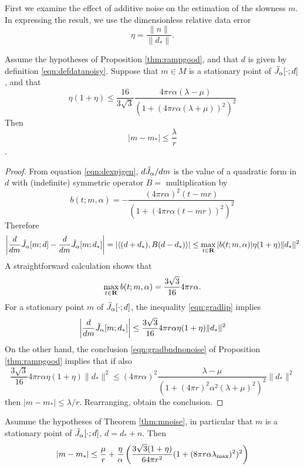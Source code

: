 First we examine the effect of additive noise on the estimation of the
slowness $m$. In expressing the result, we use the dimensionless
relative data error
\begin{equation}
  \label{eqn:defeta}
  \eta = \frac{\|n\|}{\|d_*\|}. 
\end{equation}

\begin{proposition}
  \label{thm:mnoise}
  Assume the hypotheses of Proposition \ref{thm:rampgood}, and that $d$ is
  given by definition \ref{eqn:defdatanoisy}. Suppose that $m \in M$
  is a stationary point of $\tilde{J}_{\alpha}[\cdot;d]$, and that
  \begin{equation}
    \label{eqn:mnoisebnd}
    \eta(1+\eta) \le \frac{16}{3\sqrt{3}}\frac{4\pi r \alpha
      (\lambda-\mu)}{(1+(4\pi r\alpha(\lambda+\mu))^2)^2}
  \end{equation}
  Then
  \begin{equation}
    \label{eqn:mnoisebndfin}
    |m-m_*| \le \frac{\lambda}{r}
  \end{equation}.
\end{proposition}

\begin{proof}
  From equation \ref{eqn:dexpjgen}, $d \tilde{J}_{\alpha} / dm$ is the
value of a quadratic form in $d$ with (indefinite) symmetric operator
$B = $ multiplication by
\[
  b(t;m,\alpha)  = -\frac{(4 \pi r \alpha)^2 (t-mr)}{(1+(4\pi r \alpha (t-mr))^2)^{2}}
\]
Therefore
\begin{equation}
  \label{eqn:gradlip}
  \left|\frac{d}{dm}\tilde{J}_{\alpha}[m;d]-\frac{d}{dm}\tilde{J}_{\alpha}[m;d_*]\right| =
  |\langle (d+d_*),B(d-d_*)\rangle| \le \max_{t \in
    {\bf R}}|b(t;m,\alpha)|\eta(1+\eta)\|d_*\|^2
\end{equation}
A straightforward calculation shows that
\[
  \max_{t \in {\bf R}} b(t;m,\alpha) = \frac{3\sqrt{3}}{16} 4\pi r\alpha.
\]
For a stationary point $m$ of
$\tilde{J}_{\alpha}[\cdot;d]$, the inequality \ref{eqn:gradlip} implies
\[
  \left|\frac{d}{dm}\tilde{J}_{\alpha}[m;d_*]\right| \le \frac{3\sqrt{3}}{16} 4\pi
  r\alpha \eta(1+\eta)\|d_*\|^2
\]
On the other hand, the conclusion \ref{eqn:gradbndnonoise} of Proposition
\ref{thm:rampgood} implies that if also
\[
  \frac{3\sqrt{3}}{16} 4\pi r\alpha \eta(1+\eta)\|d_*\|^2 \le (4 \pi r
  \alpha)^2 \frac{\lambda-\mu}{(1+(4\pi r)^2\alpha^2
    (\lambda+\mu)^2)^{2}} \|d_*\|^2
\]
then $|m-m_*|\le \lambda/r$. Rearranging, obtain the conclusion.
\end{proof}

\begin{corollary}
  \label{thm:mnoisecor}
  Asumme the hypotheses of Theorem \ref{thm:mnoise}, in particular
  that $m$ is a stationary point of $\tilde{J}_{\alpha}[\cdot;d]$, $d=d_*+n$. Then
  \begin{equation}
    \label{eqn:mnoisecor}
    |m-m_*| \le \frac{\mu}{r} + \frac{\eta}{\alpha} \left(\frac{3\sqrt{3}(1+\eta)}{64\pi r^2}(1+(8\pi r \alpha
      \lambda_{\rm max})^2)^2\right)
  \end{equation}
\end{corollary}

